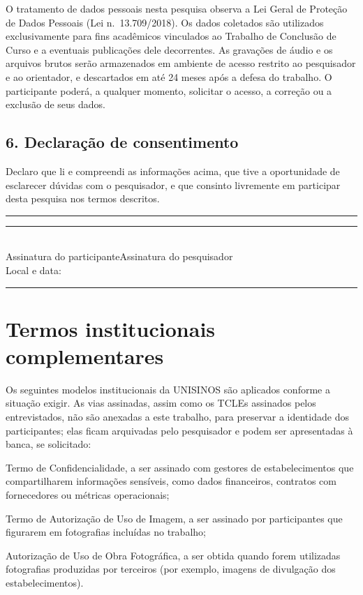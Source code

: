 O tratamento de dados pessoais nesta pesquisa observa a Lei Geral de Proteção de Dados Pessoais (Lei n.\ 13.709/2018). Os dados coletados são utilizados exclusivamente para fins acadêmicos vinculados ao Trabalho de Conclusão de Curso e a eventuais publicações dele decorrentes. As gravações de áudio e os arquivos brutos serão armazenados em ambiente de acesso restrito ao pesquisador e ao orientador, e descartados em até 24 meses após a defesa do trabalho. O participante poderá, a qualquer momento, solicitar o acesso, a correção ou a exclusão de seus dados.

\subsection*{6. Declaração de consentimento}

\noindent Declaro que li e compreendi as informações acima, que tive a oportunidade de esclarecer dúvidas com o pesquisador, e que consinto livremente em participar desta pesquisa nos termos descritos.

\vspace{2em}

\noindent\rule{0.45\textwidth}{0.4pt}\hfill\rule{0.45\textwidth}{0.4pt}\\
Assinatura do participante\hfill Assinatura do pesquisador\\[1ex]
Local e data: \rule{0.5\textwidth}{0.4pt}

\section*{Termos institucionais complementares}

Os seguintes modelos institucionais da UNISINOS são aplicados conforme a situação exigir. As vias assinadas, assim como os TCLEs assinados pelos entrevistados, não são anexadas a este trabalho, para preservar a identidade dos participantes; elas ficam arquivadas pelo pesquisador e podem ser apresentadas à banca, se solicitado:
\begin{alineas}
	\item Termo de Confidencialidade, a ser assinado com gestores de estabelecimentos que compartilharem informações sensíveis, como dados financeiros, contratos com fornecedores ou métricas operacionais;
	\item Termo de Autorização de Uso de Imagem, a ser assinado por participantes que figurarem em fotografias incluídas no trabalho;
	\item Autorização de Uso de Obra Fotográfica, a ser obtida quando forem utilizadas fotografias produzidas por terceiros (por exemplo, imagens de divulgação dos estabelecimentos).
\end{alineas}
